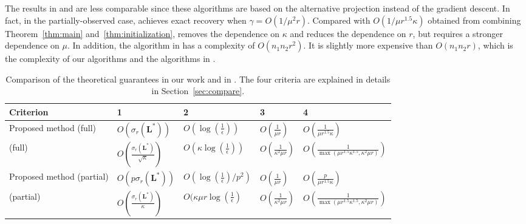 \documentclass[12pt]{article}
\newcommand{\bL}{\boldsymbol{L}}
\providecommand{\tabularnewline}{\\}
\theoremstyle{plain}
\theoremstyle{definition}
\theoremstyle{plain}
\theoremstyle{plain}
\theoremstyle{remark}
\begin{document}
The results in \cite{NIPS2014_5430} and \cite{DBLP:journals/corr/CherapanamjeriG16} are less comparable since these algorithms are based on the alternative projection instead of the gradient descent. In fact, in the partially-observed case, \cite{NIPS2014_5430} achieves exact recovery when $\gamma=O(1/\mu^2r)$. Compared with $O(1/\mu r^{1.5} \kappa)$  obtained from  combining Theorem~\ref{thm:main} and~\ref{thm:initialization},  \cite{NIPS2014_5430}  removes the dependence on $\kappa$ and reduces the dependence on $r$, but requires a stronger dependence on $\mu$. In addition, the  algorithm in  \cite{NIPS2014_5430}  has a complexity of $O(n_1n_2r^2)$. It is slightly more expensive than $O(n_1n_2r)$, which is the complexity of our algorithms and the algorithms in \cite{DBLP:conf/nips/YiPCC16}.

 
\begin{table*}[htbp]
\centering
\begin{tabular}{lllll}
\toprule 
Criterion  & 1  & 2  & 3  & 4\tabularnewline
\midrule 
Proposed method (full)  & $O(\sigma_{r}(\bL^{*}))$  & $O(\log(\frac{1}{\epsilon}))$  & $O(\frac{1}{\mu r})$ & $O(\frac{1}{\mu r^{1.5}\kappa})$\tabularnewline
\cite{DBLP:conf/nips/YiPCC16} (full)  & $O(\frac{\sigma_{r}(\bL^{*})}{\sqrt{\kappa}})$  & $O(\kappa\log(\frac{1}{\epsilon}))$  & $O(\frac{1}{\kappa^{2}\mu r})$ & $O(\frac{1}{\max(\mu r^{1.5}\kappa^{1.5},\kappa^{2}\mu r)})$\tabularnewline
Proposed method (partial)  & $O(p\sigma_{r}(\bL^{*}))$  & $O(\log(\frac{1}{\epsilon})/p^{2})$  & $O(\frac{1}{\mu r})$  & $O(\frac{p}{\mu r^{1.5}\kappa})$\tabularnewline
\cite{DBLP:conf/nips/YiPCC16} (partial)  & $O(\frac{\sigma_{r}(\bL^{*})}{\kappa})$  & $O(\kappa\mu r\log(\frac{1}{\epsilon})$  & $O(\frac{1}{\kappa^{2}\mu r})$  & $O(\frac{1}{\max(\mu r^{1.5}\kappa^{1.5},\kappa^{2}\mu r)})$\tabularnewline
\bottomrule
\end{tabular}

\caption{\small {Comparison of the theoretical guarantees in our work and in \cite{DBLP:conf/nips/YiPCC16}. The four criteria are explained in details in Section~\ref{sec:compare}.  \label{tab:compare}}}

\end{table*}




\end{document}
